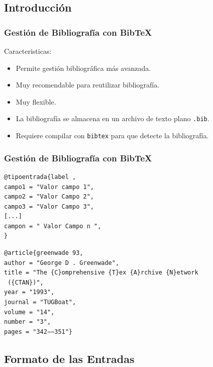 \documentclass[aspectratio=1610]{beamer}%
\begin{document}
\subsection{Introducción}
\begin{frame}[fragile]
\frametitle{\textbf{Gestión de Bibliografía con Bib\TeX{}}}
\justifying
 Caracteristicas:
 \begin{itemize}\justifying
  \item Permite gestión bibliográfica más avanzada.
  \item Muy recomendable para reutilizar bibliografía.
  \item Muy flexible.
  \item La bibliografía se almacena en un archivo de texto plano \texttt{.bib}.
  \item Requiere compilar con \texttt{bibtex} para que detecte la bibliografía.
\end{itemize}

\end{frame}

\begin{frame}[fragile]
\frametitle{\textbf{Gestión de Bibliografía con Bib\TeX{}}}
\justifying
 \begin{block}{}\small
   \vspace{-0.7cm}
\begin{lstlisting}
@tipoentrada{label , 
campo1 = "Valor campo 1", 
campo2 = "Valor Campo 2",
campo3 = "Valor Campo 3",
[...]
campon = " Valor Campo n ",
}
\end{lstlisting}\vspace{-0.3cm}

\end{block}

\begin{exampleblock}{}\small
\begin{verbatim}
@article{greenwade 93,
author = "George D . Greenwade", 
title = "The {C}omprehensive {T}ex {A}rchive {N}etwork
 ({CTAN})", 
year = "1993",
journal = "TUGBoat", 
volume = "14", 
number = "3",
pages = "342−−351"}
\end{verbatim}

\end{exampleblock}


\end{frame}

\subsection{Formato de las Entradas}
\end{document}
